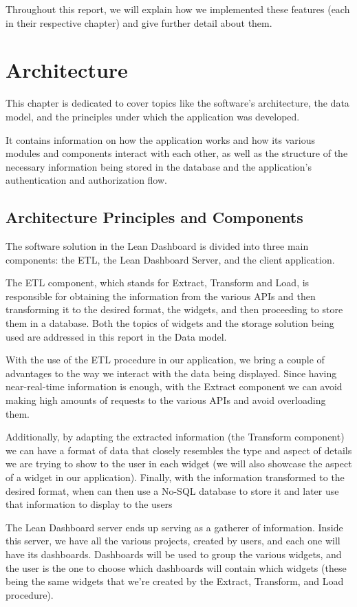 \documentclass[a4paper,twoside,10pt]{report}
\begin{document}
Throughout this report, we will explain how we implemented these features (each in their respective chapter) and give further detail about them.

\chapter{Architecture}
This chapter is dedicated to cover topics like the software's architecture, the data model, and the principles under which the application was developed. 

It contains information on how the application works and how its various modules and components interact with each other, as well as the structure of the necessary information being stored in the database and the application's authentication and authorization flow.
\section{Architecture Principles and Components}
The software solution in the Lean Dashboard is divided into three main components: the ETL\cite{ETLPROC}, the Lean Dashboard Server, and the client application.
 
The ETL component, which stands for Extract, Transform and Load, is responsible for obtaining the information from the various APIs and then transforming it to the desired format, the widgets, and then proceeding to store them in a database. Both the topics of widgets and the storage solution being used are addressed in this report in the Data model.
 
With the use of the ETL procedure in our application, we bring a couple of advantages to the way we interact with the data being displayed. Since having near-real-time information is enough, with the Extract component we can avoid making high amounts of requests to the various APIs and avoid overloading them.
 
Additionally, by adapting the extracted information (the Transform component) we can have a format of data that closely resembles the type and aspect of details we are trying to show to the user in each widget (we will also showcase the aspect of a widget in our application). Finally, with the information transformed to the desired format, when can then use a No-SQL database to store it and later use that information to display to the users 
 
The Lean Dashboard server ends up serving as a gatherer of information. Inside this server, we have all the various projects, created by users, and each one will have its dashboards. Dashboards will be used to group the various widgets, and the user is the one to choose which dashboards will contain which widgets (these being the same widgets that we're created by the Extract, Transform, and Load procedure).
 
\end{document}
